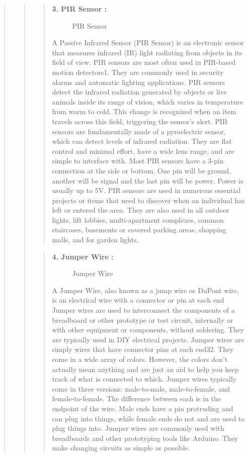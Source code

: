 \documentclass[12pt]{report}
\begin{document}
\begin{quote}
\begin{quote}
			
			\begin{quote}
				\textbf{3. PIR Sensor :}\\
				\begin{figure}
					\centering
					\caption{PIR Sensor}
				\end{figure}
				A Passive Infrared Sensor (PIR Sensor) is an electronic sensor that measures infrared (IR) light radiating from objects in its field of view. PIR sensors are most often used in PIR-based motion detectors1. They are commonly used in security alarms and automatic lighting applications. PIR sensors detect the infrared radiation generated by objects or live animals inside its range of vision, which varies in temperature from warm to cold. This change is recognized when an item travels across this field, triggering the sensor’s alert. PIR sensors are fundamentally made of a pyroelectric sensor, which can detect levels of infrared radiation. They are flat control and minimal effort, have a wide lens range, and are simple to interface with. Most PIR sensors have a 3-pin connection at the side or bottom. One pin will be ground, another will be signal and the last pin will be power. Power is usually up to 5V. PIR sensors are used in numerous essential projects or items that need to discover when an individual has left or entered the area. They are also used in all outdoor lights, lift lobbies, multi-apartment complexes, common staircases, basements or covered parking areas, shopping malls, and for garden lights.
				
			\end{quote}
			
			\begin{quote}
				\textbf{4. Jumper Wire :}\\
				\begin{figure}
					\centering
					\caption{Jumper Wire}
				\end{figure}
				A Jumper Wire, also known as a jump wire or DuPont wire, is an electrical wire with a connector or pin at each end Jumper wires are used to interconnect the components of a breadboard or other prototype or test circuit, internally or with other equipment or components, without soldering. They are typically used in DIY electrical projects. Jumper wires are simply wires that have connector pins at each end32. They come in a wide array of colors. However, the colors don’t actually mean anything and are just an aid to help you keep track of what is connected to which. Jumper wires typically come in three versions: male-to-male, male-to-female, and female-to-female. The difference between each is in the endpoint of the wire. Male ends have a pin protruding and can plug into things, while female ends do not and are used to plug things into. Jumper wires are commonly used with breadboards and other prototyping tools like Arduino. They make changing circuits as simple as possible.
				

\end{quote}
\end{quote}
\end{quote}
\end{document}
